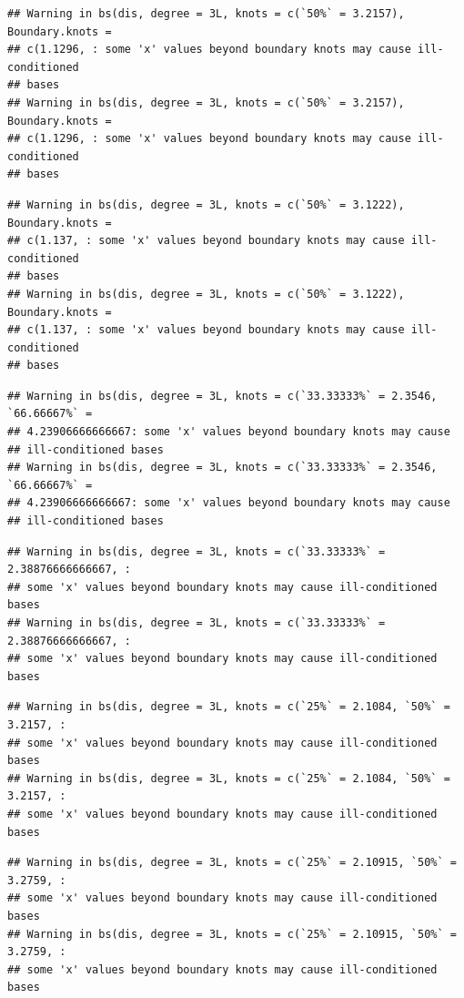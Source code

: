 \documentclass[
]{article}
\begin{document}
\begin{verbatim}
## Warning in bs(dis, degree = 3L, knots = c(`50%` = 3.2157), Boundary.knots =
## c(1.1296, : some 'x' values beyond boundary knots may cause ill-conditioned
## bases
## Warning in bs(dis, degree = 3L, knots = c(`50%` = 3.2157), Boundary.knots =
## c(1.1296, : some 'x' values beyond boundary knots may cause ill-conditioned
## bases
\end{verbatim}

\begin{verbatim}
## Warning in bs(dis, degree = 3L, knots = c(`50%` = 3.1222), Boundary.knots =
## c(1.137, : some 'x' values beyond boundary knots may cause ill-conditioned
## bases
## Warning in bs(dis, degree = 3L, knots = c(`50%` = 3.1222), Boundary.knots =
## c(1.137, : some 'x' values beyond boundary knots may cause ill-conditioned
## bases
\end{verbatim}

\begin{verbatim}
## Warning in bs(dis, degree = 3L, knots = c(`33.33333%` = 2.3546, `66.66667%` =
## 4.23906666666667: some 'x' values beyond boundary knots may cause
## ill-conditioned bases
## Warning in bs(dis, degree = 3L, knots = c(`33.33333%` = 2.3546, `66.66667%` =
## 4.23906666666667: some 'x' values beyond boundary knots may cause
## ill-conditioned bases
\end{verbatim}

\begin{verbatim}
## Warning in bs(dis, degree = 3L, knots = c(`33.33333%` = 2.38876666666667, :
## some 'x' values beyond boundary knots may cause ill-conditioned bases
## Warning in bs(dis, degree = 3L, knots = c(`33.33333%` = 2.38876666666667, :
## some 'x' values beyond boundary knots may cause ill-conditioned bases
\end{verbatim}

\begin{verbatim}
## Warning in bs(dis, degree = 3L, knots = c(`25%` = 2.1084, `50%` = 3.2157, :
## some 'x' values beyond boundary knots may cause ill-conditioned bases
## Warning in bs(dis, degree = 3L, knots = c(`25%` = 2.1084, `50%` = 3.2157, :
## some 'x' values beyond boundary knots may cause ill-conditioned bases
\end{verbatim}

\begin{verbatim}
## Warning in bs(dis, degree = 3L, knots = c(`25%` = 2.10915, `50%` = 3.2759, :
## some 'x' values beyond boundary knots may cause ill-conditioned bases
## Warning in bs(dis, degree = 3L, knots = c(`25%` = 2.10915, `50%` = 3.2759, :
## some 'x' values beyond boundary knots may cause ill-conditioned bases
\end{verbatim}
\end{document}
